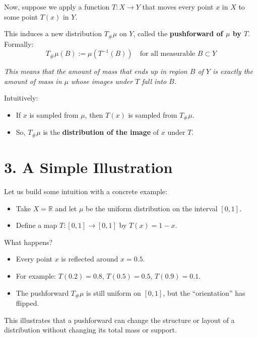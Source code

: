 \documentclass[11pt]{article}
\begin{document}
Now, suppose we apply a function $T : X \to Y$ that moves every point $x$ in $X$ to some point $T(x)$ in $Y$.

This induces a new distribution $T_\#\mu$ on $Y$, called the \textbf{pushforward of $\mu$ by $T$}. Formally:
\[
T_\#\mu(B) := \mu\left(T^{-1}(B)\right) \quad \text{for all measurable } B \subset Y
\]

\begin{highlight}
\textit{This means that the amount of mass that ends up in region $B$ of $Y$ is exactly the amount of mass in $\mu$ whose images under $T$ fall into $B$.}
\end{highlight}

Intuitively:
\begin{itemize}
    \item If $x$ is sampled from $\mu$, then $T(x)$ is sampled from $T_\#\mu$.
    \item So, $T_\#\mu$ is the \textbf{distribution of the image} of $x$ under $T$.
\end{itemize}

\section*{3. A Simple Illustration}

Let us build some intuition with a concrete example:

\begin{itemize}
    \item Take $X = \mathbb{R}$ and let $\mu$ be the uniform distribution on the interval $[0,1]$.
    \item Define a map $T : [0,1] \to [0,1]$ by $T(x) = 1 - x$.
\end{itemize}

What happens?
\begin{itemize}
    \item Every point $x$ is reflected around $x = 0.5$.
    \item For example: $T(0.2) = 0.8$, $T(0.5) = 0.5$, $T(0.9) = 0.1$.
    \item The pushforward $T_\#\mu$ is still uniform on $[0,1]$, but the ``orientation'' has flipped.
\end{itemize}

\begin{highlight}
This illustrates that a pushforward can change the structure or layout of a distribution without changing its total mass or support.
\end{highlight}
\end{document}
